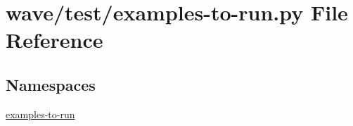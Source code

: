 \hypertarget{wave_2test_2examples-to-run_8py}{}\section{wave/test/examples-\/to-\/run.py File Reference}
\label{wave_2test_2examples-to-run_8py}
\subsection*{Namespaces}
\begin{DoxyCompactItemize}
\item 
 \hyperlink{namespaceexamples-to-run}{examples-\/to-\/run}
\end{DoxyCompactItemize}
